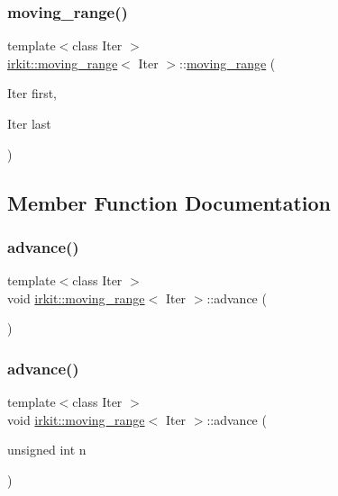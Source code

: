 \subsubsection{\texorpdfstring{moving\+\_\+range()}{moving\_range()}\hspace{0.1cm}{\footnotesize\ttfamily [2/2]}}
{\footnotesize\ttfamily template$<$class Iter $>$ \\
\mbox{\hyperlink{structirkit_1_1moving__range}{irkit\+::moving\+\_\+range}}$<$ Iter $>$\+::\mbox{\hyperlink{structirkit_1_1moving__range}{moving\+\_\+range}} (\begin{DoxyParamCaption}\item[{Iter}]{first,  }\item[{Iter}]{last }\end{DoxyParamCaption})\hspace{0.3cm}{\ttfamily [inline]}}



\subsection{Member Function Documentation}
\mbox{\label{structirkit_1_1moving__range_a5ee65e31d2983395c02b724ede47c034}} 
\subsubsection{\texorpdfstring{advance()}{advance()}\hspace{0.1cm}{\footnotesize\ttfamily [1/2]}}
{\footnotesize\ttfamily template$<$class Iter $>$ \\
void \mbox{\hyperlink{structirkit_1_1moving__range}{irkit\+::moving\+\_\+range}}$<$ Iter $>$\+::advance (\begin{DoxyParamCaption}{ }\end{DoxyParamCaption})\hspace{0.3cm}{\ttfamily [inline]}}

\mbox{\label{structirkit_1_1moving__range_a792efd70f3efcb651bff438a0e0814ce}} 
\subsubsection{\texorpdfstring{advance()}{advance()}\hspace{0.1cm}{\footnotesize\ttfamily [2/2]}}
{\footnotesize\ttfamily template$<$class Iter $>$ \\
void \mbox{\hyperlink{structirkit_1_1moving__range}{irkit\+::moving\+\_\+range}}$<$ Iter $>$\+::advance (\begin{DoxyParamCaption}\item[{unsigned int}]{n }\end{DoxyParamCaption})\hspace{0.3cm}{\ttfamily [inline]}}


